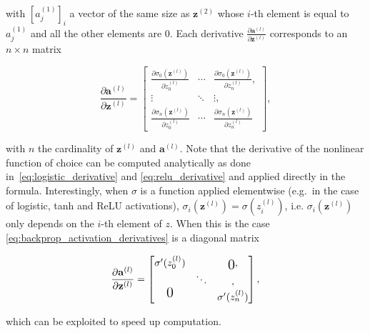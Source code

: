 \noindent with $[a_{j}^{(1)}]_i$ a vector of the same size as $\mathbf{z}^{(2)}$
whose $i$-th element is equal to $a_j^{(1)}$ and all the other elements are
$0$. Each derivative $\frac{\partial \mathbf{a}^{(l)}}{\partial
\mathbf{z}^{(l)}}$ corresponds to an $n \times n$ matrix

\begin{equation}\label{eq:backprop_activation_derivatives}
    \frac{\partial \mathbf{a}^{(l)}}{\partial \mathbf{z}^{(l)}} =
    \begin{bmatrix}
        \frac{\partial \sigma_{0}(\mathbf{z}^{(l)})}
             {\partial z^{(l)}_{0}} & \cdots &
        \frac{\partial \sigma_{0}(\mathbf{z}^{(l)})}
             {\partial z^{(l)}_{n}} ,\\
        \vdots & \ddots & \vdots ,\\
        \frac{\partial \sigma_{n}(\mathbf{z}^{(l)})}
             {\partial z^{(l)}_{0}} & \cdots &
        \frac{\partial \sigma_{n}(\mathbf{z}^{(l)})}
             {\partial z^{(l)}_{n}}
    \end{bmatrix},
\end{equation}

\noindent with $n$ the cardinality of $\mathbf{z}^{(l)}$ and
$\mathbf{a}^{(l)}$. Note that the derivative of the nonlinear function of
choice can be computed analytically as done in~\autoref{eq:logistic_derivative}
and \autoref{eq:relu_derivative} and applied directly in the formula.
Interestingly, when $\sigma$ is a function applied elementwise (e.g.\ in the
case of logistic, tanh and ReLU activations),
$\sigma_{i}(\mathbf{z}^{(l)})=\sigma(z_{i}^{(l)})$, i.e.
$\sigma_{i}(\mathbf{z}^{(l)})$ only depends on the $i$-th element of $z$. When
this is the case \autoref{eq:backprop_activation_derivatives} is a diagonal
matrix

\begin{equation}
    \frac{\partial \mathbf{a}^{(l)}}{\partial \mathbf{z}^{(l)}} =
    \begin{bmatrix}
        \sigma'(z_{0}^{(l)}) & & \text{\raisebox{-0.75ex}{\Large 0}} ,\\
        & \ddots & ,\\
        \text{\raisebox{0.75ex}{\Large 0}}
        & & \sigma'(z_{n}^{(l)})
    \end{bmatrix},
\end{equation}

\noindent which can be exploited to speed up computation.



